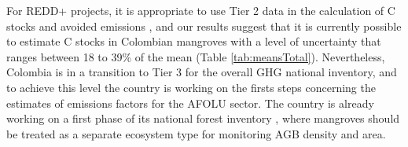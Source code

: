 \documentclass[review, authoryear]{elsarticle}   	%
\DeclareRobustCommand{\Jhoa}{\todo[author=Jhoa, inline, color=yellow!40, size=\small]}
\begin{document}
For REDD+ projects, it is appropriate to use Tier 2 data in the calculation of C stocks and avoided emissions \citep{Maniatis2010}, and our results suggest that it is currently possible to estimate C stocks in Colombian mangroves with a level of uncertainty that ranges between 18 to 39\% of the mean (Table \ref{tab:meansTotal}).
Nevertheless, Colombia is in a transition to Tier 3 for the overall GHG national inventory, and to achieve this level the country is working on the firsts steps concerning the estimates of emissions factors for the AFOLU sector. The country is already working on a first phase of its national forest inventory \citep{IDEAM2015}, where mangroves should be treated as a separate ecosystem type for monitoring AGB density and area. 



\end{document}
